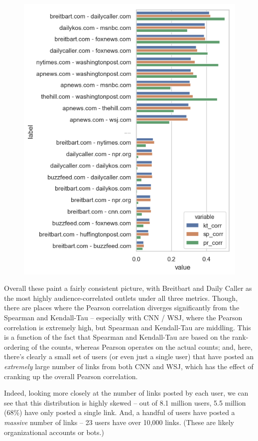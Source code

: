 \documentclass{scrartcl}
\begin{document}
\begin{figure}[H]
  \centering
  \includegraphics[height=0.4\textheight]{figures/user-graph-bars-all.png}
\end{figure}

Overall these paint a fairly consistent picture, with Breitbart and Daily Caller as the most highly audience-correlated outlets under all three metrics. Though, there are places where the Pearson correlation diverges significantly from the Spearman and Kendall-Tau -- especially with CNN / WSJ, where the Pearson correlation is extremely high, but Spearman and Kendall-Tau are middling. This is a function of the fact that Spearman and Kendall-Tau are based on the rank-ordering of the counts, whereas Pearson operates on the actual counts; and, here, there's clearly a small set of users (or even just a single user) that have posted an \textit{extremely} large number of links from both CNN and WSJ, which has the effect of cranking up the overall Pearson correlation.

Indeed, looking more closely at the number of links posted by each user, we can see that this distribution is highly skewed -- out of 8.1 million users, 5.5 million (68\%) have only posted a single link. And, a handful of users have posted a \textit{massive} number of links -- 23 users have over 10,000 links. (These are likely organizational accounts or bots.)
\end{document}
